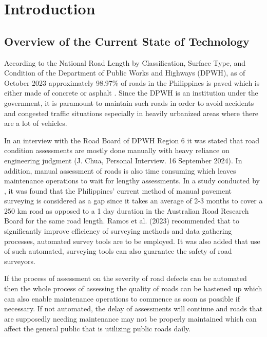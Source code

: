 \chapter{Introduction}
\label{sec:researchdesc}    %

\section{Overview of the Current State of Technology}
\label{sec:overview}

According to the National Road Length by Classification, Surface Type, and Condition of the Department of Public Works and Highways (DPWH), as of October 2023 approximately 98.97\% of roads in the Philippines is paved which is either made of concrete or asphalt \cite{balita2024}. Since the DPWH is an institution under the government, it is paramount to maintain such roads in order to avoid accidents and congested traffic situations especially in heavily urbanized areas where there are a lot of vehicles.

In an interview with the Road Board of DPWH Region 6 it was stated that road condition assessments are mostly done manually with heavy reliance on engineering judgment (J. Chua, Personal Interview. 16 September 2024). In addition, manual assessment of roads is also time consuming which leaves maintenance operations to wait for lengthy assessments.  In a study conducted by , it was found that the Philippines’ current method of manual pavement surveying is considered as a gap since it takes an average of 2-3 months to cover a 250 km road as opposed to a 1 day duration in the Australian Road Research Board for the same road length. Ramos et al. (2023) recommended that to significantly improve efficiency of surveying methods and data gathering processes, automated survey tools are to be employed. It was also added that use of such automated, surveying tools can also guarantee the safety of road surveyors.

If the process of assessment on the severity of road defects can be automated then the whole process of assessing the quality of roads can be hastened up which can also enable maintenance operations to commence as soon as possible if necessary. If not automated, the delay of assessments will continue and roads that are supposedly needing maintenance may not be properly maintained which can affect the general public that is utilizing public roads daily.

